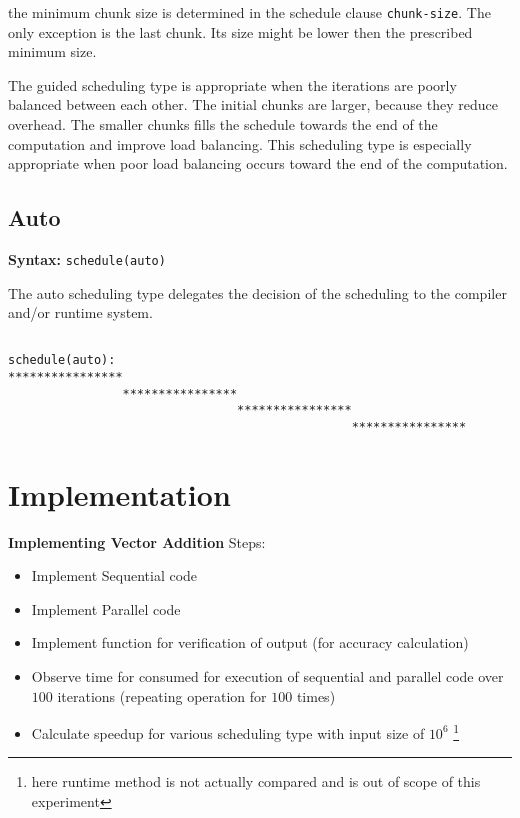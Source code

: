 \documentclass[paper=letter, fontsize=12pt]{article}
\begin{document}
the minimum chunk size is determined in the schedule clause \verb|chunk-size|. The only exception is the last chunk. Its size might be lower then the prescribed minimum size.

The guided scheduling type is appropriate when the iterations are poorly balanced between each other. The initial chunks are larger, because they reduce overhead. The smaller chunks fills the schedule towards the end of the computation and improve load balancing. This scheduling type is especially appropriate when poor load balancing occurs toward the end of the computation.

\subsection{Auto}
\textbf{Syntax:} \verb|schedule(auto)|

The auto scheduling type delegates the decision of the scheduling to the compiler and/or runtime system.

\subsection{}
\begin{verbatim}
schedule(auto):        
****************                                                
                ****************                                
                                ****************                
                                                ****************
\end{verbatim}
\section{Implementation}\label{section:implementation}
\textbf{Implementing Vector Addition}
Steps:
\begin{itemize}
	\item Implement Sequential code
	\item Implement Parallel code
	\item Implement function for verification of output (for accuracy calculation)
	\item Observe time for consumed for execution of sequential and parallel code over $ 100 $ iterations (repeating operation for $ 100 $ times)
	\item Calculate speedup for various scheduling type with input size of $ 10^6 $ \footnote{here runtime method is not actually compared and is out of scope of this experiment}
\end{itemize}
\end{document}

